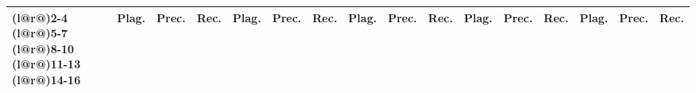 \begin{table}[th]
\begin{tabularx}{\textwidth}{@{}l*{15}{X}}
\cmidrule(l@{\tabcolsep}r@{\tabcolsep}){2-4} \cmidrule(l@{\tabcolsep}r@{\tabcolsep}){5-7} \cmidrule(l@{\tabcolsep}r@{\tabcolsep}){8-10} \cmidrule(l@{\tabcolsep}r@{\tabcolsep}){11-13} \cmidrule(l@{\tabcolsep}r@{\tabcolsep}){14-16} 
& {\footnotesize Plag.} & {\footnotesize Prec.} & {\footnotesize Rec.}  & {\footnotesize Plag.} & {\footnotesize Prec.} & {\footnotesize Rec.}  & {\footnotesize Plag.} & {\footnotesize Prec.} & {\footnotesize Rec.}  & {\footnotesize Plag.} & {\footnotesize Prec.} & {\footnotesize Rec.} & {\footnotesize Plag.} & {\footnotesize Prec.} & {\footnotesize Rec.} \\
\midrule


\end{tabularx}
\end{table}
